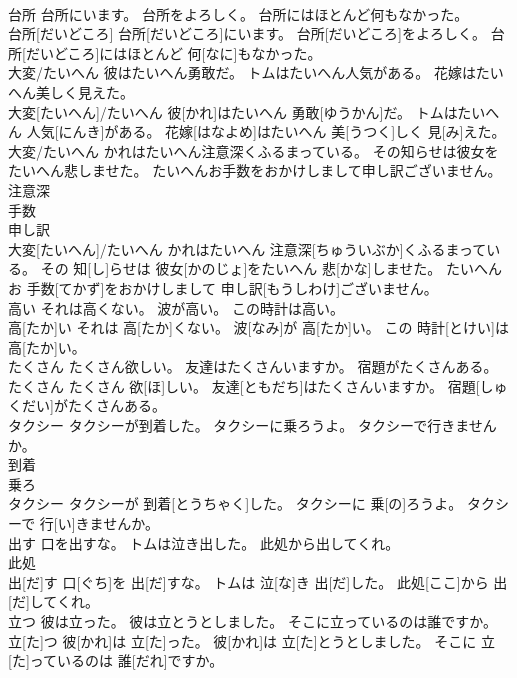 \documentclass[8pt]{extreport}
\begin{document}
\begin{CJK}{UTF8}{min}
\\	台所 台所にいます。 台所をよろしく。 台所にはほとんど何もなかった。	
\\	台所[だいどころ] 台所[だいどころ]にいます。 台所[だいどころ]をよろしく。 台所[だいどころ]にはほとんど 何[なに]もなかった。
\\	大変/たいへん 彼はたいへん勇敢だ。 トムはたいへん人気がある。 花嫁はたいへん美しく見えた。	
\\	大変[たいへん]/たいへん 彼[かれ]はたいへん 勇敢[ゆうかん]だ。 トムはたいへん 人気[にんき]がある。 花嫁[はなよめ]はたいへん 美[うつく]しく 見[み]えた。
\\	大変/たいへん かれはたいへん注意深くふるまっている。 その知らせは彼女をたいへん悲しませた。 たいへんお手数をおかけしまして申し訳ございません。	
\\	注意深 
\\	手数 
\\	申し訳 
\\	大変[たいへん]/たいへん かれはたいへん 注意深[ちゅういぶか]くふるまっている。 その 知[し]らせは 彼女[かのじょ]をたいへん 悲[かな]しませた。 たいへんお 手数[てかず]をおかけしまして 申し訳[もうしわけ]ございません。
\\	高い それは高くない。 波が高い。 この時計は高い。	
\\	高[たか]い それは 高[たか]くない。 波[なみ]が 高[たか]い。 この 時計[とけい]は 高[たか]い。
\\	たくさん たくさん欲しい。 友達はたくさんいますか。 宿題がたくさんある。	
\\	たくさん たくさん 欲[ほ]しい。 友達[ともだち]はたくさんいますか。 宿題[しゅくだい]がたくさんある。
\\	タクシー タクシーが到着した。 タクシーに乗ろうよ。 タクシーで行きませんか。	
\\	到着 
\\	乗ろ 
\\	タクシー タクシーが 到着[とうちゃく]した。 タクシーに 乗[の]ろうよ。 タクシーで 行[い]きませんか。
\\	出す 口を出すな。 トムは泣き出した。 此処から出してくれ。	
\\	此処 
\\	出[だ]す 口[ぐち]を 出[だ]すな。 トムは 泣[な]き 出[だ]した。 此処[ここ]から 出[だ]してくれ。
\\	立つ 彼は立った。 彼は立とうとしました。 そこに立っているのは誰ですか。	
\\	立[た]つ 彼[かれ]は 立[た]った。 彼[かれ]は 立[た]とうとしました。 そこに 立[た]っているのは 誰[だれ]ですか。

\end{CJK}
\end{document}
